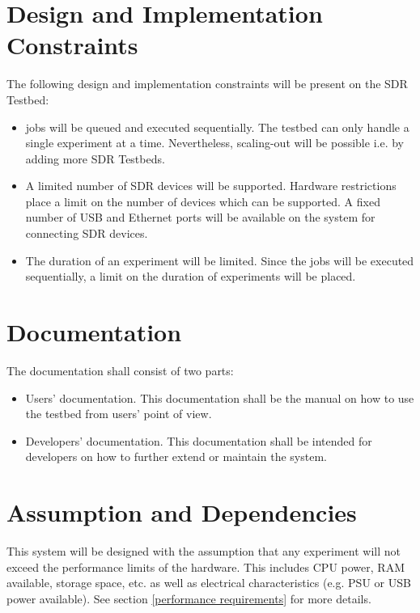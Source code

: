 \documentclass[english,titlepage,a4paper]{report}
\begin{document}
\section{Design and Implementation Constraints}

The following design and implementation constraints will be present on the \gls{SDR Testbed}:
\begin{itemize}
\item \Glspl{job} will be queued and executed sequentially.
  The testbed can only handle a single \gls{experiment} at a time.
  Nevertheless, scaling-out will be possible i.e. by adding more \gls{SDR Testbed}s.
\item A limited number of \acrshort{SDR} devices will be supported.
  Hardware restrictions place a limit on the number of devices which can be supported.
  A fixed number of \acrshort{USB} and \gls{Ethernet} ports will be available on the system for connecting \acrshort{SDR} devices.
\item The duration of an \gls{experiment} will be limited.
  Since the \glspl{job} will be executed sequentially, a limit on the duration of \glspl{experiment} will be placed.
\end{itemize}

\section{Documentation}

The documentation shall consist of two parts:
\begin{itemize}
\item Users' documentation.
  This documentation shall be the manual on how to use the testbed from users' point of view.
\item Developers' documentation.
  This documentation shall be intended for developers on how to further extend or maintain the system.
\end{itemize}

\section{Assumption and Dependencies}

This system will be designed with the assumption that any \gls{experiment} will not exceed the performance limits of the hardware.
This includes \acrshort{CPU} power, \acrshort{RAM} available, storage space, etc. as well as electrical characteristics (e.g. \acrshort{PSU} or \acrshort{USB} power available).
See section \ref{performance requirements} for more details.
\end{document}
